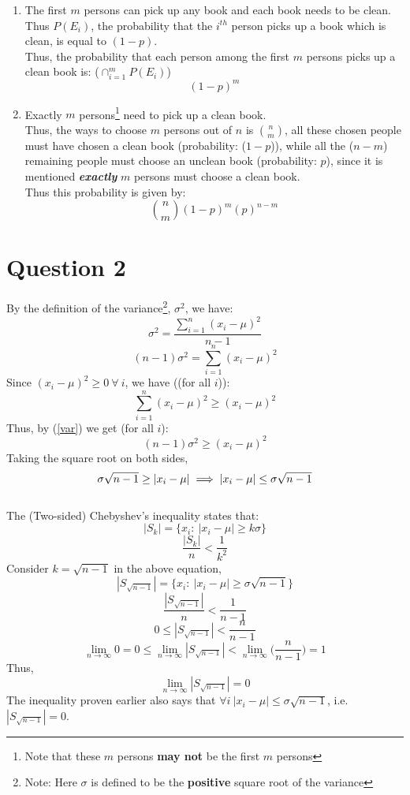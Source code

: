 \documentclass[11pt]{article}
\begin{document}
\begin{enumerate}[label=(\alph*)]
    \item The first $m$ persons can pick up any book and each book needs to be clean. Thus $P(E_i)$, the probability that the $i^{th}$ person picks up a book which is clean, is equal to $(1-p)$.\\
          Thus, the probability that each person among the first $m$ persons picks up a clean book is: ($ \cap_{i=1}^{m} P(E_i) $)
          $$ (1-p)^m $$

    \item Exactly $m$ persons\footnote{Note that these $m$ persons \textbf{may not} be the first $m$ persons} need to pick up a clean book.\\
          Thus, the ways to choose $m$ persons out of $n$ is ${n\choose m}$, all these chosen people must have chosen a clean book (probability: ($1-p$)), while all the ($ n-m $) remaining people must choose an unclean book (probability: $p$), since it is mentioned \textbf{\textit{exactly}} $m$ persons must choose a clean book.\\
          Thus this probability is given by:
          $$ {n\choose m} (1-p)^m (p)^{n-m} $$

\end{enumerate}



\newpage
\section*{Question 2}
By the definition of the variance\footnote{Note: Here $\sigma$ is defined to be the \textbf{positive} square root of the variance}, $\sigma^2$, we have:
$$ \sigma^2 = \frac{\sum_{i=1}^n (x_i - \mu)^2}{n-1} $$
\begin{equation}
    \label{var}
    (n-1)\sigma^2 = \sum_{i=1}^n (x_i - \mu)^2
\end{equation}
Since $(x_i - \mu)^2 \ge 0 \  \forall \ i$, we have ((for all $i$)):
$$ \sum_{i=1}^n (x_i - \mu)^2 \ge (x_i - \mu)^2  $$
Thus, by (\ref{var}) we get (for all $i$):
$$ (n-1)\sigma^2 \ge (x_i - \mu)^2 $$
Taking the square root on both sides,
$$ \sigma\sqrt{n-1} \ge |x_i - \mu| \implies |x_i - \mu| \le \sigma\sqrt{n-1} \hfill $$
\hfill \qedsymbol \\
\noindent
The (Two-sided) Chebyshev's inequality states that:
$$ |S_k| = \{ x_i : \  |x_i - \mu| \ge k\sigma \} $$
\begin{equation}
    \frac{|S_k|}{n} < \frac{1}{k^2}
\end{equation}
Consider $k = \sqrt{n-1}$ in the above equation,\\
$$ |S_{\sqrt{n-1}}| = \{ x_i : \  |x_i - \mu| \ge \sigma\sqrt{n-1} \} $$
$$ \frac{|S_{\sqrt{n-1}}|}{n} < \frac{1}{n-1} $$
$$ 0 \leq |S_{\sqrt{n-1}}| < \frac{n}{n-1}$$
$$ \lim_{n\to\infty}0=0 \leq \lim_{n\to\infty}|S_{\sqrt{n-1}}| < \lim_{n\to\infty}\bigg( \frac{n}{n-1} \bigg)=1$$
Thus,
$$ \lim_{n\to\infty}|S_{\sqrt{n-1}}| = 0 $$
The inequality proven earlier also says that $\forall i \ |x_i - \mu| \le \sigma \sqrt{n-1}$, i.e. $|S_{\sqrt{n-1}}| = 0$.\\
\end{document}
